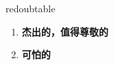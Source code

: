 
\begin{frame}
{\huge redoubtable}
\begin{center}
\begin{enumerate}\Large
  \item \textbf{杰出的，值得尊敬的}
  \item \textbf{可怕的}
\end{enumerate}
\end{center}
\end{frame}
